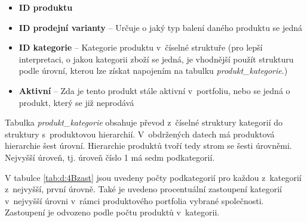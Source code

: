 \begin{itemize}
    \itemsep0em 
    \item \textbf{ID produktu}
    \item \textbf{ID prodejní varianty} -- Určuje o jaký typ balení daného produktu se jedná    
    \item \textbf{ID kategorie} -- Kategorie produktu v~číselné struktuře (pro lepší interpretaci, o jakou kategorii zboží se jedná, je vhodnější použít strukturu podle úrovní, kterou lze získat napojením na tabulku \emph{produkt\_kategorie}.)
    \item \textbf{Aktivní} --  Zda je tento produkt stále aktivní v~portfoliu, nebo se jedná o produkt, který se již neprodává
\end{itemize}

Tabulka \emph{produkt\_kategorie} obsahuje převod z~číselné struktury kategorií do struktury s~produktovou hierarchií. V~obdržených datech má produktová hierarchie šest úrovní. Hierarchie produktů tvoří tedy strom se šesti úrovněmi. Nejvyšší úroveň, tj. úroveň číslo 1 má sedm podkategorií.

V tabulce \ref*{tab:d:4Bzast} jsou uvedeny počty podkategorií pro každou z~kategorií z~nejvyšší, první úrovně. Také je uvedeno procentuální zastoupení kategorií v~nejvyšší úrovni v~rámci produktového portfolia vybrané společnosti. Zastoupení je odvozeno podle počtu produktů v~kategorii.

